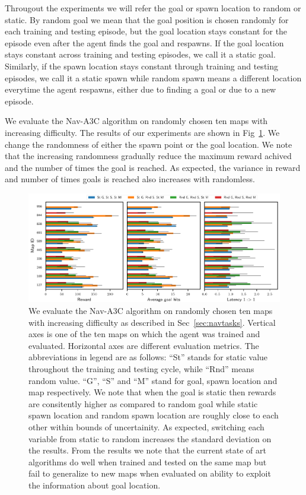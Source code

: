 Througout the experiments we will refer the goal or spawn location to random or static.
By random goal we mean that the goal position is chosen randomly for each training and testing episode, but the goal location stays constant for the episode even after the agent finds the goal and respawns.
If the goal location stays constant across training and testing episodes, we call it a static goal.
Similarly, if the spawn location stays constant through training and testing episodes, we call it a static spawn while random spawn means a different location everytime the agent respawns, either due to finding a goal or due to a new episode.





We evaluate the Nav-A3C\cite{MiPaViICLR2017} algorithm on randomly chosen ten maps with increasing difficulty.
The results of our experiments are shown in Fig~\ref{fig:latency-goal-reward}.
We change the randomness of either the spawn point or the goal location.
We note that the increasing randomness gradually reduce the maximum reward achived and the number of times the goal is reached. As expected, the variance in reward and number of times goals is reached also increases with randomless.

\begin{figure}%
  \includegraphics[width=\linewidth]{images/plot_summary_bar_plots.pdf}%
  \vspace{-1em}%
  \caption{We evaluate the Nav-A3C\cite{MiPaViICLR2017} algorithm on randomly chosen ten maps with increasing difficulty as described in Sec~\ref{sec:navtasks}.
  Vertical axes is one of the ten maps on which the agent was trained and evaluated.
  Horizontal axes are different evaluation metrics.
  The abbreviations in legend are as follows: ``St'' stands for
  static value throughout the training and testing cycle, while ``Rnd'' means random value. ``G'', ``S'' and ``M'' stand for goal, spawn location and map respectively.
  We note that when the goal is static then rewards are consitently higher as compared to random goal while static spawn location and random spawn location are roughly close to each other within bounds of uncertainity. As expected, switching each variable from static to random increases the standard deviation on the results.
  From the \LatencyOneGtOne{} results we note that the current state of art algorithms do well when trained and tested on the same map but fail to generalize to new maps when evaluated on ability to exploit the information about goal location.}%
\label{fig:latency-goal-reward}%
\end{figure}


